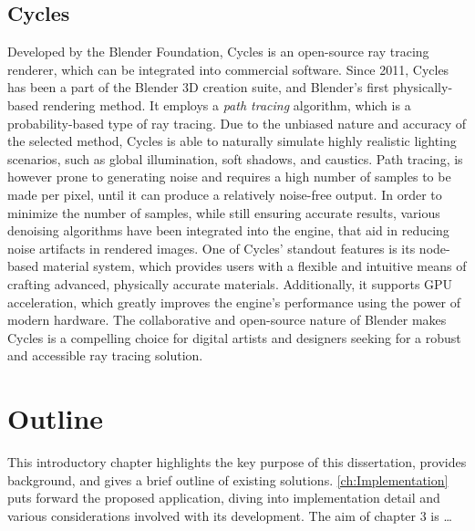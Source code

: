 \subsection{Cycles}

Developed by the Blender Foundation, Cycles \supercite{Cycles} is an open-source ray tracing renderer, which can be integrated into commercial software. 
Since 2011, Cycles has been a part of the Blender 3D creation suite, and Blender's first physically-based rendering method.
It employs a \textit{path tracing} algorithm, which is a probability-based type of ray tracing.
Due to the unbiased nature and accuracy of the selected method, Cycles is able to naturally simulate highly realistic lighting scenarios, such as global illumination, soft shadows, and caustics.
Path tracing, is however prone to generating noise and requires a high number of samples to be made per pixel, until it can produce a relatively noise-free output.
In order to minimize the number of samples, while still ensuring accurate results, various denoising algorithms have been integrated into the engine, that aid in reducing noise artifacts in rendered images.
One of Cycles' standout features is its node-based material system, which provides users with a flexible and intuitive means of crafting advanced, physically accurate materials. 
Additionally, it supports GPU acceleration, which greatly improves the engine's performance using the power of modern hardware.
The collaborative and open-source nature of Blender makes Cycles is a compelling choice for digital artists and designers seeking for a robust and accessible ray tracing solution.

\section{Outline}

This introductory chapter highlights the key purpose of this dissertation, provides background, and gives a brief outline of existing solutions. 
\cref{ch:Implementation} puts forward the proposed application, diving into implementation detail and various considerations involved with its development. The aim of chapter 3 is \dots
